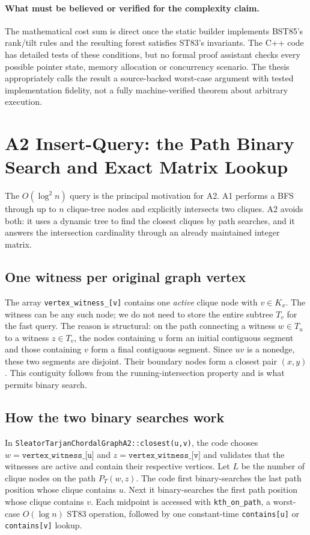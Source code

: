\paragraph{What must be believed or verified for the complexity claim.} The mathematical cost sum is direct once the static builder implements BST85's rank/tilt rules and the resulting forest satisfies ST83's invariants.  The C++ code has detailed tests of these conditions, but no formal proof assistant checks every possible pointer state, memory allocation or concurrency scenario.  The thesis appropriately calls the result a source-backed worst-case argument with tested implementation fidelity, not a fully machine-verified theorem about arbitrary execution.

\section{A2 Insert-Query: the Path Binary Search and Exact Matrix Lookup}
\label{sec:a2-query-impl}
The \(O(\log^2 n)\) query is the principal motivation for A2.  A1 performs a BFS through up to \(n\) clique-tree nodes and explicitly intersects two cliques.  A2 avoids both: it uses a dynamic tree to find the closest cliques by path searches, and it answers the intersection cardinality through an already maintained integer matrix.

\subsection{One witness per original graph vertex}
The array \texttt{vertex\_witness\_[v]} contains one \emph{active} clique node with \(v\in K_x\).  The witness can be any such node; we do not need to store the entire subtree \(T_v\) for the fast query.  The reason is structural: on the path connecting a witness \(w\in T_u\) to a witness \(z\in T_v\), the nodes containing \(u\) form an initial contiguous segment and those containing \(v\) form a final contiguous segment.  Since \(uv\) is a nonedge, these two segments are disjoint.  Their boundary nodes form a closest pair \((x,y)\).  This contiguity follows from the running-intersection property and is what permits binary search.

\subsection{How the two binary searches work}
In \texttt{SleatorTarjanChordalGraphA2::closest(u,v)}, the code chooses \(w=\texttt{vertex\_witness\_[u]}\) and \(z=\texttt{vertex\_witness\_[v]}\) and validates that the witnesses are active and contain their respective vertices.  Let \(L\) be the number of clique nodes on the path \(P_T(w,z)\).  The code first binary-searches the last path position whose clique contains \(u\).  Next it binary-searches the first path position whose clique contains \(v\).  Each midpoint is accessed with \texttt{kth\_on\_path}, a worst-case \(O(\log n)\) ST83 operation, followed by one constant-time \texttt{contains[u]} or \texttt{contains[v]} lookup.

